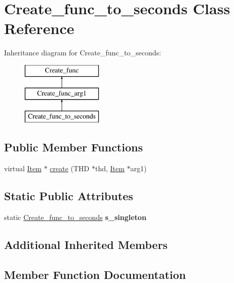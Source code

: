 \hypertarget{classCreate__func__to__seconds}{}\section{Create\+\_\+func\+\_\+to\+\_\+seconds Class Reference}
\label{classCreate__func__to__seconds}
Inheritance diagram for Create\+\_\+func\+\_\+to\+\_\+seconds\+:\begin{figure}[H]
\begin{center}
\leavevmode
\includegraphics[height=3.000000cm]{classCreate__func__to__seconds}
\end{center}
\end{figure}
\subsection*{Public Member Functions}
\begin{DoxyCompactItemize}
\item 
virtual \mbox{\hyperlink{classItem}{Item}} $\ast$ \mbox{\hyperlink{classCreate__func__to__seconds_a00c3b8d47a44f76b7d068064e547dae3}{create}} (T\+HD $\ast$thd, \mbox{\hyperlink{classItem}{Item}} $\ast$arg1)
\end{DoxyCompactItemize}
\subsection*{Static Public Attributes}
\begin{DoxyCompactItemize}
\item 
\mbox{\label{classCreate__func__to__seconds_a2cfdbcf52342dd0e5789b53f1f256e60}} 
static \mbox{\hyperlink{classCreate__func__to__seconds}{Create\+\_\+func\+\_\+to\+\_\+seconds}} {\bfseries s\+\_\+singleton}
\end{DoxyCompactItemize}
\subsection*{Additional Inherited Members}


\subsection{Member Function Documentation}
\mbox{\label{classCreate__func__to__seconds_a00c3b8d47a44f76b7d068064e547dae3}} 
